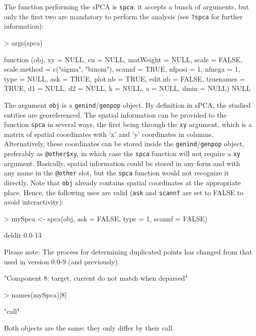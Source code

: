 \documentclass{article}
\begin{document}
The function performing the sPCA is \texttt{spca}; it accepts a bunch
of arguments, but only the first two are mandatory to perform the
analysis (see \texttt{?spca} for further information):
\begin{Schunk}
\begin{Sinput}
> args(spca)
\end{Sinput}
\begin{Soutput}
function (obj, xy = NULL, cn = NULL, matWeight = NULL, scale = FALSE, 
    scale.method = c("sigma", "binom"), scannf = TRUE, nfposi = 1, 
    nfnega = 1, type = NULL, ask = TRUE, plot.nb = TRUE, edit.nb = FALSE, 
    truenames = TRUE, d1 = NULL, d2 = NULL, k = NULL, a = NULL, 
    dmin = NULL) 
NULL
\end{Soutput}
\end{Schunk}
The argument \texttt{obj} is a \texttt{genind}/\texttt{genpop} object.
By definition in sPCA, the studied entities are georeferenced.
The spatial information can be provided to the function \texttt{spca}
in several ways, the first being through the \texttt{xy} argument,
which is a matrix of spatial coordinates with
'x' and 'y' coordinates in columns.
Alternatively, these coordinates can be stored inside the
\texttt{genind}/\texttt{genpop} object, preferably as
\texttt{@other\$xy}, in which case the \texttt{spca} function will not
require a \texttt{xy} argument.
Basically, spatial information could be stored in any form and with
any name in the \texttt{@other} slot, but the \texttt{spca} function
would not recognize it directly.
Note that \texttt{obj} already contains spatial coordinates at the
appropriate place.
Hence, the following uses are valid (\texttt{ask} and \texttt{scannf}
are set to FALSE to avoid interactivity):
\begin{Schunk}
\begin{Sinput}
> mySpca <- spca(obj, ask = FALSE, type = 1, scannf = FALSE)
\end{Sinput}
\begin{Soutput}
deldir 0.0-13 

     Please note: The process for determining duplicated points
     has changed from that used in version 0.0-9 (and previously).
\end{Soutput}
\begin{Soutput}
[1] "Component 8: target, current do not match when deparsed"
\end{Soutput}
\begin{Sinput}
> names(mySpca)[8]
\end{Sinput}
\begin{Soutput}
[1] "call"
\end{Soutput}
\end{Schunk}
\noindent Both objects are the same: they only differ by their call.
\\
\end{document}
